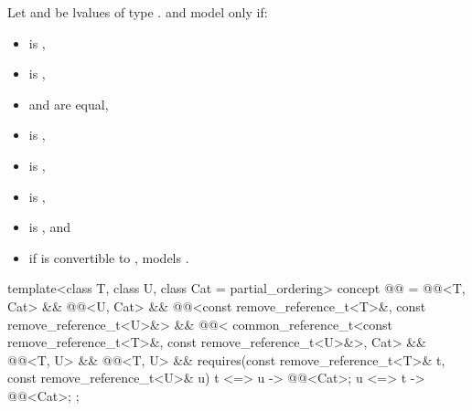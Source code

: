 \pnum
Let  and  be lvalues
of type .
 and 
model  only if:
\begin{itemize}
\item
   is ,
\item
   is ,
\item
   and  are equal,
\item
   is ,
\item
   is ,
\item
   is ,
\item
   is , and
\item
  if  is convertible to ,  models
  .
\end{itemize}

\begin{codeblock}
template<class T, class U, class Cat = partial_ordering>
  concept @@ =
    @@<T, Cat> &&
    @@<U, Cat> &&
    @@<const remove_reference_t<T>&, const remove_reference_t<U>&> &&
    @@<
      common_reference_t<const remove_reference_t<T>&, const remove_reference_t<U>&>, Cat> &&
    @@<T, U> &&
    @@<T, U> &&
    requires(const remove_reference_t<T>& t, const remove_reference_t<U>& u) {
      { t <=> u } -> @@<Cat>;
      { u <=> t } -> @@<Cat>;
    };
\end{codeblock}

